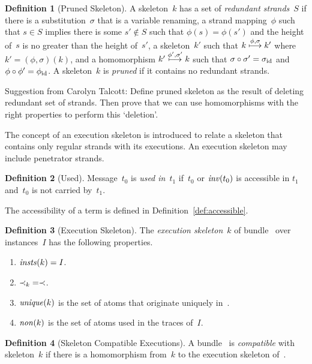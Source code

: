 \documentclass[12pt]{article}
\theoremstyle{definition}
\newtheorem{defn}{Definition}[section]
\newenvironment{note}{\itshape\par\noindent}{}
\begin{document}
\begin{defn}[Pruned Skeleton]
A skeleton~$k$ has a set of \emph{redundant strands}~$S$ if there is a
substitution~$\sigma$ that is a variable renaming, a strand
mapping~$\phi$ such that $s\in S$ implies there is some $s'\notin S$
such that $\phi(s)=\phi(s')$ and the height of~$s$ is no greater than
the height of~$s'$, a skeleton~$k'$ such that
$k\stackrel{\phi,\sigma}{\longmapsto}k'$ where $k'=(\phi,\sigma)(k)$, and a
homomorphism $k'\stackrel{\phi',\sigma'}{\longmapsto}k$ such that
$\sigma\circ\sigma'=\sigma_{\mathrm{id}}$ and $\phi\circ\phi'=\phi_{\mathrm{id}}$.  A
skeleton~$k$ is \emph{pruned} if it contains no redundant strands.
\end{defn}

\begin{note}
Suggestion from Carolyn Talcott:  Define pruned skeleton as the result
of deleting redundant set of strands.  Then prove that we can use
homomorphisms with the right properties to perform this `deletion'.
\end{note}

The concept of an execution skeleton is introduced to relate a skeleton
that contains only regular strands with its executions.  An execution
skeleton may include penetrator strands.

\begin{defn}[Used]\label{def:used}
Message~$t_0$ is \emph{used in}~$t_1$
if~$t_0$ or $\operatorname{\mathit{inv}}(t_0)$ is accessible in $t_1$ and~$t_0$ is not
carried by~$t_1$.
\end{defn}
The accessibility of a term is defined in
Definition~\ref{def:accessible}.

\begin{defn}[Execution Skeleton]\label{def:execution skeleton}
The \emph{execution skeleton}~$k$ of bundle~{\bundle}
over instances~$I$ has the following properties.
\begin{enumerate}
\item $\operatorname{\mathit{insts}}(k)=I$.
\item $\mathbin{\prec_{k}} = \prec$.
\item $\operatorname{\mathit{unique}}(k)$ is the set of atoms that originate uniquely
  in~{\bundle}.
\item $\operatorname{\mathit{non}}(k)$ is the set of atoms used in the traces of~$I$.
\end{enumerate}
\end{defn}

\begin{defn}[Skeleton Compatible Executions]
A bundle~{\bundle} is \emph{compatible} with skeleton~$k$ if
there is a homomorphism from~$k$ to the execution skeleton
of~{\bundle}.
\end{defn}
\end{document}
